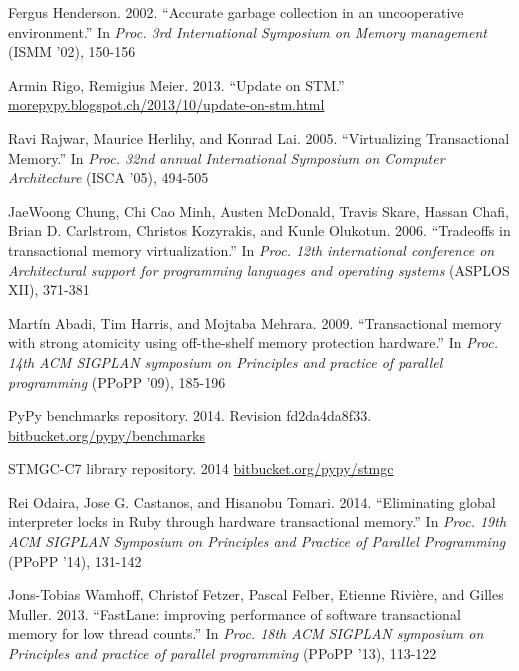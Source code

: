 \documentclass{sigplanconf}
\begin{document}
\begin{thebibliography}{}
 Fergus Henderson. 2002. ``Accurate garbage collection
  in an uncooperative environment.'' In \emph{Proc. 3rd
    International Symposium on Memory management} (ISMM '02), 150-156

 Armin Rigo, Remigius Meier. 2013. ``Update on
  STM.'' \url{morepypy.blogspot.ch/2013/10/update-on-stm.html}

 Ravi Rajwar, Maurice Herlihy, and Konrad
  Lai. 2005. ``Virtualizing Transactional Memory.'' In \emph{Proc.
    32nd annual International Symposium on Computer Architecture}
  (ISCA '05), 494-505

 JaeWoong Chung, Chi Cao Minh, Austen McDonald,
  Travis Skare, Hassan Chafi, Brian D. Carlstrom, Christos Kozyrakis,
  and Kunle Olukotun. 2006. ``Tradeoffs in transactional memory
  virtualization.'' In \emph{Proc. 12th international conference on
    Architectural support for programming languages and operating
    systems} (ASPLOS XII), 371-381

 Martín Abadi, Tim Harris, and Mojtaba
  Mehrara. 2009. ``Transactional memory with strong atomicity using
  off-the-shelf memory protection hardware.'' In \emph{Proc. 14th ACM
    SIGPLAN symposium on Principles and practice of parallel
    programming} (PPoPP '09), 185-196

 PyPy benchmarks repository. 2014. Revision
  fd2da4da8f33. \url{bitbucket.org/pypy/benchmarks}

 STMGC-C7 library repository. 2014
  \url{bitbucket.org/pypy/stmgc}




  Rei Odaira, Jose G. Castanos, and Hisanobu Tomari. 2014. ``Eliminating
  global interpreter locks in Ruby through hardware transactional
  memory.'' In \emph{Proc. 19th ACM SIGPLAN Symposium on
    Principles and Practice of Parallel Programming} (PPoPP '14), 131-142 

  Jons-Tobias Wamhoff, Christof Fetzer, Pascal Felber, Etienne
  Rivière, and Gilles Muller. 2013. ``FastLane: improving performance
  of software transactional memory for low thread counts.'' In
  \emph{Proc. 18th ACM SIGPLAN symposium on Principles and practice of
    parallel programming} (PPoPP '13), 113-122


\end{thebibliography}
\end{document}
